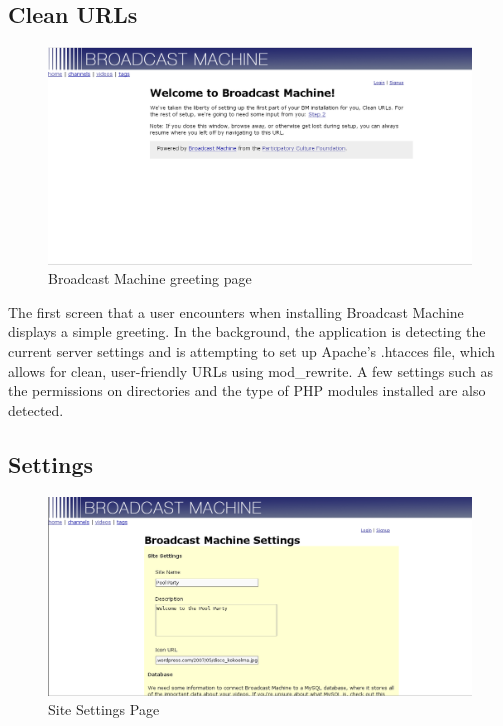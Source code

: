 \documentclass[a4paper,12pt]{report}
\begin{document}
\subsection{Clean URLs}
  \begin{figure}[h!]
  \begin{center}
  \includegraphics[width=150mm]{./images/setup1.png}
  \caption{Broadcast Machine greeting page}
  \end{center}
  \end{figure}
The first screen that a user encounters when installing Broadcast Machine displays a simple greeting.
In the background, the application is detecting the current server settings and is attempting to set up Apache's .htacces file, which allows for clean, user-friendly URLs using mod\_rewrite.
A few settings such as the permissions on directories and the type of PHP modules installed are also detected.

\subsection{Settings}
\begin{figure}[h!]
\begin{center}
\includegraphics[width=150mm]{./images/setup2.png}
\caption{Site Settings Page}
\end{center}
\end{figure}
\end{document}
